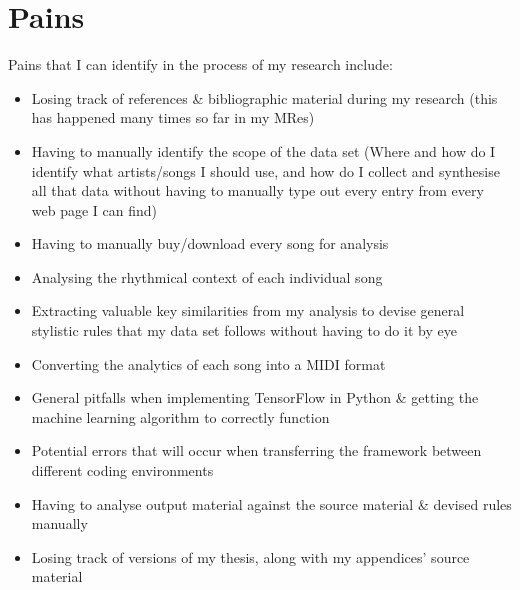 \documentclass{article}
\begin{document}
\section{Pains}
Pains that I can identify in the process of my research include:
\begin{itemize}
    \item Losing track of references \& bibliographic material during my research (this has happened many times so far in my MRes)
    \item Having to manually identify the scope of the data set (Where and how do I identify what artists/songs I should use, and how do I collect and synthesise all that data without having to manually type out every entry from every web page I can find)
    \item Having to manually buy/download every song for analysis
    \item Analysing the rhythmical context of each individual song
    \item Extracting valuable key similarities from my analysis to devise general stylistic rules that my data set follows without having to do it by eye
    \item Converting the analytics of each song into a MIDI format
    \item General pitfalls when implementing TensorFlow in Python \& getting the machine learning algorithm to correctly function
    \item Potential errors that will occur when transferring the framework between different coding environments
    \item Having to analyse output material against the source material \& devised rules manually
    \item Losing track of versions of my thesis, along with my appendices' source material
\end{itemize}
\end{document}
